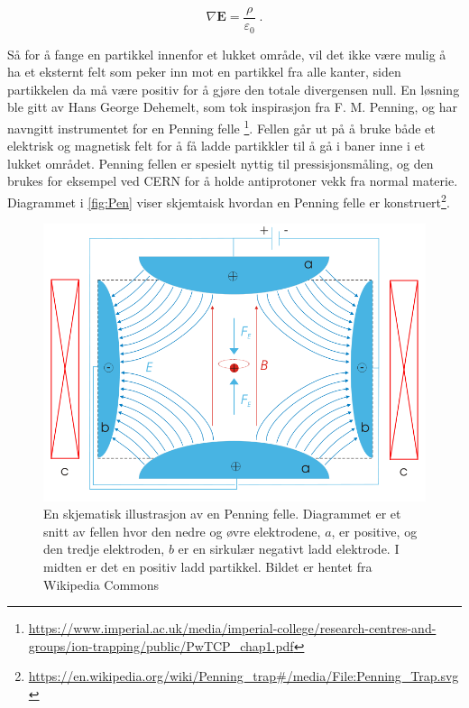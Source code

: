 \documentclass[reprint,english,notitlepage, nofootinbib]{revtex4-1}  %
\begin{document}
\begin{equation}
\label{gauss}
\nabla{\mathbf{E}} = \frac{\rho}{\varepsilon_0} \; .
\end{equation} 

Så for å fange en partikkel innenfor et lukket område, vil det ikke være mulig å ha et eksternt felt som peker inn mot en partikkel fra alle kanter, siden partikkelen da må være positiv for å gjøre den totale divergensen null. En løsning ble gitt av Hans George Dehemelt, som tok inspirasjon fra F. M. Penning, og har navngitt instrumentet for en Penning felle \footnote{\url{https://www.imperial.ac.uk/media/imperial-college/research-centres-and-groups/ion-trapping/public/PwTCP_chap1.pdf}}. Fellen går ut på å bruke både et elektrisk og magnetisk felt for å få ladde partikkler til å gå i baner inne i et lukket området. Penning fellen er spesielt nyttig til pressisjonsmåling, og den brukes for eksempel ved CERN for å holde antiprotoner vekk fra normal materie. Diagrammet i \autoref{fig:Pen} viser skjemtaisk hvordan en Penning felle er konstruert\footnote{\url{https://en.wikipedia.org/wiki/Penning_trap\#/media/File:Penning_Trap.svg}}. 

\begin{figure}
\centering
\includegraphics[scale=0.27]{penning.png}
\caption{En skjematisk illustrasjon av en Penning felle. Diagrammet er et snitt av fellen hvor den nedre og øvre elektrodene, $a$, er positive, og den tredje elektroden, $b$ er en sirkulær negativt ladd elektrode. I midten er det en positiv ladd partikkel. Bildet er hentet fra Wikipedia Commons}
\label{fig:Pen}
\end{figure}
\end{document}
